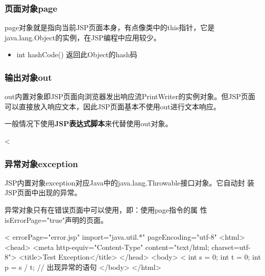 \begin{frame}[fragile] %
  \frametitle{页面对象page} 

  page对象就是指向当前JSP页面本身，有点像类中的this指针，它是java.lang.Object的实例，在JSP编程中应用较少。

  \begin{itemize}
  \item int hashCode() 返回此Object的hash码
  \end{itemize}
\end{frame}


\begin{frame}[fragile] %
  \frametitle{输出对象out}

  out内置对象即JSP页面向浏览器发出响应流PrintWriter的实例对象。但JSP页面
  可以直接放入响应文本，因此JSP页面基本不使用out进行文本响应。

  一般情况下使用{\bf\Red JSP表达式脚本}来代替使用out对象。

  \begin{jspCode}
    <%
  \end{jspCode}
\end{frame}

\begin{frame}[fragile] %
  \frametitle{异常对象exception} 

  JSP内置对象exception对应Java中的java.lang.Throwable接口对象。它自动封
  装JSP页面中出现的异常。

  异常对象只有在{\hei\Blue 错误页面}中可以使用，即：{\kai\Red 使用page指令的属
    性{\Blue isErrorPage="true"}声明的页面。}

  
  \begin{jspCode}
    <%
      errorPage="error.jsp" import="java.util.*" pageEncoding="utf-8" %
    <html>
      <head>
        <meta http-equiv="Content-Type" content="text/html; charset=utf-8">
        <title>Test Exception</title>
      </head>
      <body>
        <%
          int s = 0;
          int t = 0; 
          int p = s / t; // 出现异常的语句
      </body>
    </html>  
  \end{jspCode}
\end{frame}

